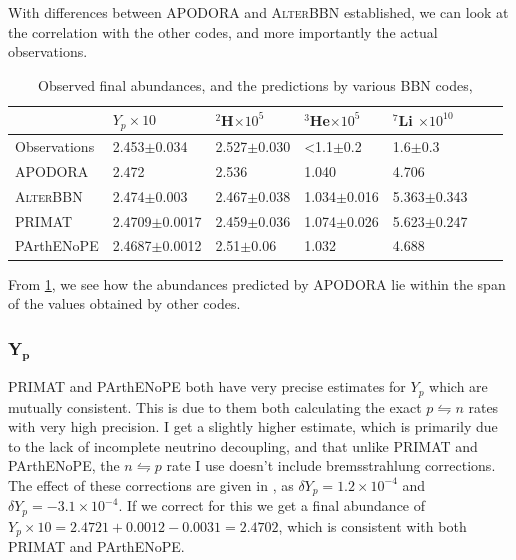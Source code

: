 With differences between APODORA and \textsc{AlterBBN} established, we can look at the correlation with the other codes, and more importantly the actual observations. 
\begin{table}[ht]
    \begin{tabular}{l|llllll}
               & $Y_p \times 10$ & \hspace{-0.34em}$^{2}$H$ \times 10^{5}$ & \hspace{-0.34em}$^{3}$He$ \times 10^{5}$ & \hspace{-0.34em}$^{7}$Li $ \times 10^{10}$\\ \hline
    Observations  & 2.453$\pm$0.034    & 2.527$\pm$0.030 & <1.1$\pm$0.2 & 1.6$\pm$0.3    \\ \hline
    APODORA  & 2.472            & 2.536 & 1.040 & 4.706     \\ \hline
    \textsc{AlterBBN} & 2.474$\pm$0.003 & 2.467$\pm$0.038 & 1.034$\pm$0.016 & 5.363$\pm$0.343    \\ \hline
    PRIMAT & 2.4709$\pm$0.0017   & 2.459$\pm$0.036 & 1.074$\pm$0.026 & 5.623$\pm$0.247   \\ \hline
    PArthENoPE& 2.4687$\pm$0.0012     & 2.51$\pm$0.06 & 1.032  & 4.688      
    \end{tabular}
    \caption{Observed final abundances\cite{Yp_Aver_2021}\cite{deuterium_Cooke_2018}\cite{Allobsabun}, and the predictions by various BBN codes\cite{AlterBBN}\cite{PRIMAT}\cite{PArthENoPE},}
    \label{tab:Obsabun}
\end{table}
From \cref{tab:Obsabun}, we see how the abundances predicted by APODORA lie within the span of the values obtained by other codes. 

\subsubsection{Y$_\textbf{p}$}
PRIMAT and PArthENoPE both have very precise estimates for $Y_p$ which are mutually consistent. This is due to them both calculating the exact $p\leftrightharpoons n$ rates with very high precision. I get a slightly higher estimate, which is primarily due to the lack of incomplete neutrino decoupling, and that unlike PRIMAT and PArthENoPE, the $n \leftrightharpoons p$ rate I use doesn't include bremsstrahlung corrections\cite{Serpico_2004}. The effect of these corrections are given in \textcite[table V]{PRIMAT}, as $\delta Y_p = 1.2\times10^{-4}$ and $\delta Y_p = -3.1\times10^{-4}$. If we correct for this we get a final abundance of $Y_p\times 10 = 2.4721+0.0012-0.0031=2.4702$, which is consistent with both PRIMAT and PArthENoPE.


